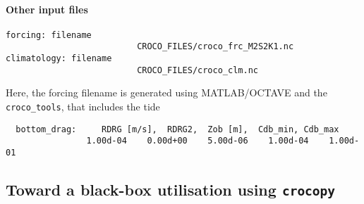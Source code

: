 \documentclass{article}
\begin{document}
\paragraph{Other input files}
\begin{lstlisting}
forcing: filename
                          CROCO_FILES/croco_frc_M2S2K1.nc
climatology: filename
                          CROCO_FILES/croco_clm.nc
\end{lstlisting}
Here, the forcing filename is generated using \textsc{MATLAB/OCTAVE} and the \texttt{croco\_tools}, that includes the tide                        


\begin{lstlisting}
  bottom_drag:     RDRG [m/s],  RDRG2,  Zob [m],  Cdb_min, Cdb_max
                1.00d-04    0.00d+00    5.00d-06    1.00d-04    1.00d-01
\end{lstlisting}

\subsection{Toward a black-box utilisation using \texttt{crocopy}}
\end{document}
